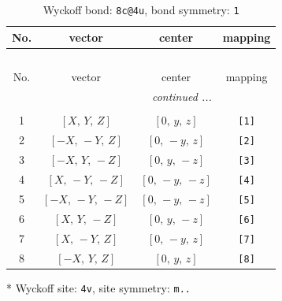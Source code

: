 \documentclass[fleqn,8pt]{jsarticle}
\begin{document}
\renewcommand{\arraystretch}{1.2}
\begin{longtable}{cccc}
\caption{Wyckoff bond: {\tt 8c@4u}, bond symmetry: {\tt 1}}
 \\
 \hline \hline
No. & vector & center & mapping \\ \hline \endfirsthead

\multicolumn{3}{l}{\tablename\ \thetable{}} \\
 \hline \hline
No. & vector & center & mapping \\ \hline \endhead

 \hline \hline
\multicolumn{3}{r}{\footnotesize\it continued ...} \\ \endfoot

 \hline \hline
\multicolumn{3}{r}{} \\ \endlastfoot

1 & $\left[ X,\, Y,\, Z \right]$ & $\left[ 0,\, y,\, z \right]$ & {\tt [1]} \\ \hline
2 & $\left[ - X,\, - Y,\, Z \right]$ & $\left[ 0,\, - y,\, z \right]$ & {\tt [2]} \\ \hline
3 & $\left[ - X,\, Y,\, - Z \right]$ & $\left[ 0,\, y,\, - z \right]$ & {\tt [3]} \\ \hline
4 & $\left[ X,\, - Y,\, - Z \right]$ & $\left[ 0,\, - y,\, - z \right]$ & {\tt [4]} \\ \hline
5 & $\left[ - X,\, - Y,\, - Z \right]$ & $\left[ 0,\, - y,\, - z \right]$ & {\tt [5]} \\ \hline
6 & $\left[ X,\, Y,\, - Z \right]$ & $\left[ 0,\, y,\, - z \right]$ & {\tt [6]} \\ \hline
7 & $\left[ X,\, - Y,\, Z \right]$ & $\left[ 0,\, - y,\, z \right]$ & {\tt [7]} \\ \hline
8 & $\left[ - X,\, Y,\, Z \right]$ & $\left[ 0,\, y,\, z \right]$ & {\tt [8]} \\
\end{longtable}
* Wyckoff site: {\tt 4v}, site symmetry: {\tt m..}
\renewcommand{\arraystretch}{1.2}
\end{document}
